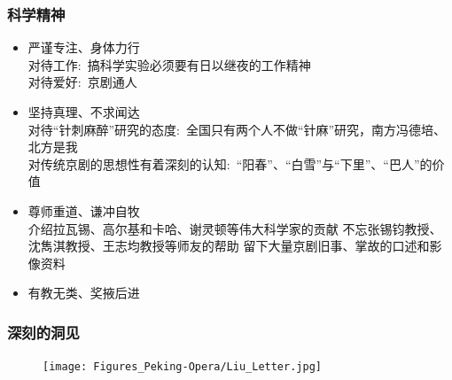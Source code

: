 \frame
{
	\frametitle{科学精神}
	\begin{itemize}
		\item 严谨专注、身体力行\\
			对待工作:~搞科学实验必须要有日以继夜的工作精神\\
			对待爱好:~京剧通人 
		\item 坚持真理、不求闻达\\
			对待``针刺麻醉''研究的态度:~全国只有两个人不做``针麻''研究，南方冯德培、北方是我\\
			对传统京剧的思想性有着深刻的认知:~``阳春''、``白雪''与``下里''、``巴人''的价值
		\item 尊师重道、谦冲自牧\\
			介绍拉瓦锡、高尔基和卡哈、谢灵顿等伟大科学家的贡献
			不忘张锡钧教授、沈雋淇教授、王志均教授等师友的帮助
			留下大量京剧旧事、掌故的口述和影像资料
		\item 有教无类、奖掖后进
	\end{itemize}
}

\frame
{
	\frametitle{深刻的洞见}
{\fontsize{6.2pt}{4.2pt}}
\begin{figure}[h!]
\centering
\vspace{-0.1in}
\texttt{[image: Figures\_Peking-Opera/Liu\_Letter.jpg]}
\label{Liu_Letter}
\end{figure}
}

